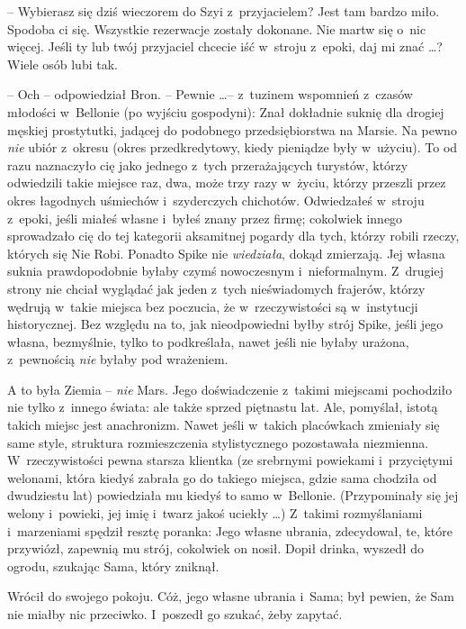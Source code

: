 \documentclass[oneside,polish,11pt,rmheadings]{mwbk}
\begin{document}
-- Wybierasz się dziś wieczorem do Szyi z~przyjacielem? Jest tam bardzo miło. Spodoba ci się. Wszystkie rezerwacje zostały dokonane. Nie martw się o~nic więcej. Jeśli ty lub twój przyjaciel chcecie iść w~stroju z~epoki, daj mi znać \ldots  ? Wiele osób lubi tak. 

-- Och -- odpowiedział Bron. -- Pewnie \ldots -- z~tuzinem wspomnień z~czasów młodości w~Bellonie (po wyjściu gospodyni): Znał dokładnie suknię dla drogiej męskiej prostytutki, jadącej do podobnego przedsiębiorstwa na Marsie. Na pewno \textit{nie }ubiór z~okresu (okres przedkredytowy, kiedy pieniądze były w~użyciu). To od razu naznaczyło cię jako jednego z~tych przerażających turystów, którzy odwiedzili takie miejsce raz, dwa, może trzy razy w~życiu, którzy przeszli przez okres łagodnych uśmiechów i~szyderczych chichotów. Odwiedzałeś w~stroju z~epoki, jeśli miałeś własne i~byłeś znany przez firmę; cokolwiek innego sprowadzało cię do tej kategorii aksamitnej pogardy dla tych, którzy robili rzeczy, których się Nie Robi. Ponadto Spike nie \textit{wiedziała}, dokąd zmierzają. Jej własna suknia prawdopodobnie byłaby czymś nowoczesnym i~nieformalnym. Z~drugiej strony nie chciał wyglądać jak jeden z~tych nieświadomych frajerów, którzy wędrują w~takie miejsca bez poczucia, że w~rzeczywistości są w~instytucji historycznej. Bez względu na to, jak nieodpowiedni byłby strój Spike, jeśli jego własna, bezmyślnie, tylko to podkreślała, nawet jeśli nie byłaby urażona, z~pewnością \textit{nie }byłaby pod wrażeniem. 

A to była Ziemia -- \textit{nie }Mars. Jego doświadczenie z~takimi miejscami pochodziło nie tylko z~innego świata: ale także sprzed piętnastu lat. Ale, pomyślał, istotą takich miejsc jest anachronizm. Nawet jeśli w~takich placówkach zmieniały się same style, struktura rozmieszczenia stylistycznego pozostawała niezmienna. W~rzeczywistości pewna starsza klientka (ze srebrnymi powiekami i~przyciętymi welonami, która kiedyś zabrała go do takiego miejsca, gdzie sama chodziła od dwudziestu lat) powiedziała mu kiedyś to samo w~Bellonie. (Przypominały się jej welony i~powieki, jej imię i~twarz jakoś uciekły \ldots ) Z~takimi rozmyślaniami i~marzeniami spędził resztę poranka: Jego własne ubrania, zdecydował, te, które przywiózł, zapewnią mu strój, cokolwiek on nosił. Dopił drinka, wyszedł do ogrodu, szukając Sama, który zniknął. 

Wrócił do swojego pokoju. Cóż, jego własne ubrania i~Sama; był pewien, że Sam nie miałby nic przeciwko. I~poszedł go szukać, żeby zapytać. 
\end{document}
